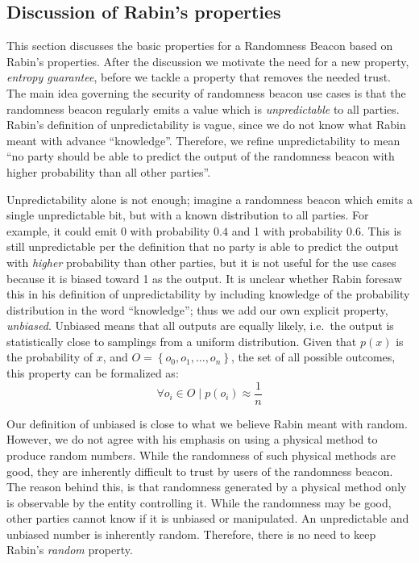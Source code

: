 \subsection{Discussion of Rabin's properties}
This section discusses the basic properties for a Randomness Beacon based on Rabin's properties.
After the discussion we motivate the need for a new property, \emph{entropy guarantee}, before we tackle a property that removes the needed trust.
The main idea governing the security of randomness beacon use cases is that the randomness beacon regularly emits a value which is \emph{unpredictable} to all parties.
Rabin's definition of unpredictability is vague, since we do not know what Rabin meant with advance \enquote{knowledge}.
Therefore, we refine unpredictability to mean \enquote{no party should be able to predict the output of the randomness beacon with higher probability than all other parties}.

Unpredictability alone is not enough; imagine a randomness beacon which emits a single unpredictable bit, but with a known distribution to all parties.
For example, it could emit 0 with probability $0.4$ and 1 with probability $0.6$.
This is still unpredictable per the definition that no party is able to predict the output with \emph{higher} probability than other parties, but it is not useful for the use cases because it is biased toward 1 as the output.
It is unclear whether Rabin foresaw this in his definition of unpredictability by including knowledge of the probability distribution in the word \enquote{knowledge}; thus we add our own explicit property, \emph{unbiased}.
Unbiased means that all outputs are equally likely, i.e.\ the output is statistically close to samplings from a uniform distribution. Given that $p(x)$ is the probability of $x$, and $O = \left\{ {o_0, o_1, \ldots, o_n} \right\}$, the set of all possible outcomes, this property can be formalized as:
\[
    \forall o_i \in O \mid p(o_i) \approx \frac{1}{n}
\]

Our definition of unbiased is close to what we believe Rabin meant with random.
However, we do not agree with his emphasis on using a physical method to produce random numbers.
While the randomness of such physical methods are good, they are inherently difficult to trust by users of the randomness beacon.
The reason behind this, is that randomness generated by a physical method only is observable by the entity controlling it.
While the randomness may be good, other parties cannot know if it is unbiased or manipulated.
An unpredictable and unbiased number is inherently random.
Therefore, there is no need to keep Rabin's \emph{random} property.

